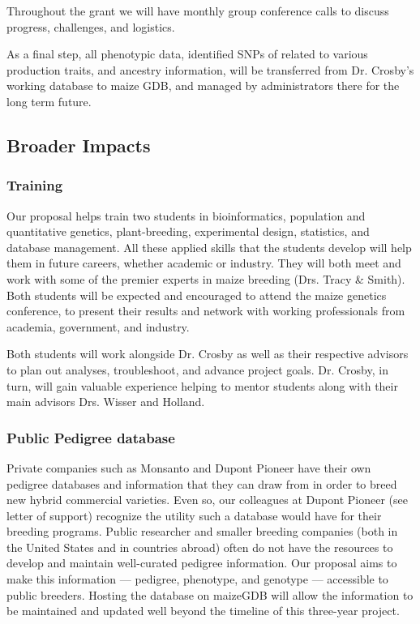\documentclass[12pt]{article}
\begin{document}
Throughout the grant we will have monthly group conference calls to discuss progress, challenges, and logistics. 

As a final step, all phenotypic data, identified SNPs of related to various production traits, and ancestry information, will be transferred from Dr. Crosby's working database to maize GDB, and managed by administrators there for the long term future.

\subsection*{Broader Impacts}

\subsubsection*{Training}
Our proposal helps train two students in bioinformatics, population and quantitative genetics, plant-breeding, experimental design, statistics, and database management. 
All these applied skills that the students develop will help them in future careers, whether academic or industry. 
They will both meet and work with some of the premier experts in maize breeding (Drs. Tracy \& Smith). 
Both students will be expected and encouraged to attend the maize genetics conference, to present their results and network with working professionals from academia, government, and industry.

Both students will work alongside Dr. Crosby as well as their respective advisors to plan out analyses, troubleshoot, and advance project goals. 
Dr. Crosby, in turn, will gain valuable experience helping to mentor students along with their main advisors Drs. Wisser and Holland. 

\subsubsection*{Public Pedigree database}
Private companies such as Monsanto and Dupont Pioneer have their own pedigree databases and information that they can draw from in order to breed new hybrid commercial varieties. 
Even so, our colleagues at Dupont Pioneer (see letter of support) recognize the utility such a database would have for their breeding programs.
Public researcher and smaller breeding companies  (both in the United States and in countries abroad) often do not have the resources to develop and maintain well-curated pedigree information. 
Our proposal aims to make this information --- pedigree, phenotype, and genotype --- accessible to public breeders.
Hosting the database on maizeGDB will allow the information to be maintained and updated well beyond the timeline of this three-year project.
\end{document}
